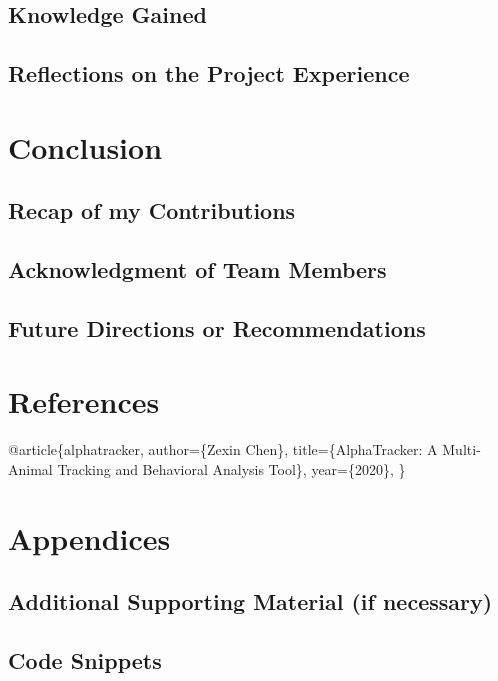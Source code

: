 \documentclass[
  11pt,
]{article}
\begin{document}
\hypertarget{knowledge-gained}{%
\subsection{Knowledge Gained}\label{knowledge-gained}}

\hypertarget{reflections-on-the-project-experience}{%
\subsection{Reflections on the Project
Experience}\label{reflections-on-the-project-experience}}

\hypertarget{conclusion}{%
\section{Conclusion}\label{conclusion}}

\hypertarget{recap-of-my-contributions}{%
\subsection{Recap of my Contributions}\label{recap-of-my-contributions}}

\hypertarget{acknowledgment-of-team-members}{%
\subsection{Acknowledgment of Team
Members}\label{acknowledgment-of-team-members}}

\hypertarget{future-directions-or-recommendations}{%
\subsection{Future Directions or
Recommendations}\label{future-directions-or-recommendations}}

\hypertarget{references}{%
\section{References}\label{references}}

@article\{alphatracker, author=\{Zexin Chen\}, title=\{AlphaTracker: A
Multi-Animal Tracking and Behavioral Analysis Tool\}, year=\{2020\}, \}

\hypertarget{appendices}{%
\section{Appendices}\label{appendices}}

\hypertarget{additional-supporting-material-if-necessary}{%
\subsection{Additional Supporting Material (if
necessary)}\label{additional-supporting-material-if-necessary}}

\hypertarget{code-snippets}{%
\subsection{Code Snippets}\label{code-snippets}}
\end{document}
